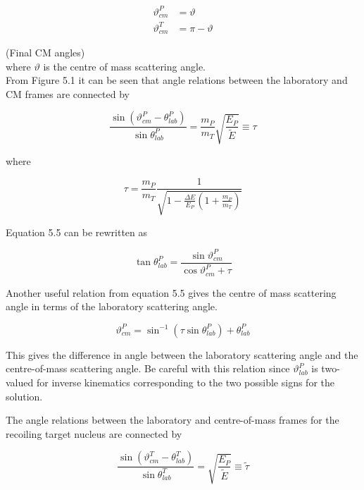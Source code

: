 \documentclass[10pt]{article}
\begin{document}
$$
\begin{aligned}
\vartheta_{c m}^{P} & =\vartheta \\
\vartheta_{c m}^{T} & =\pi-\vartheta
\end{aligned}
$$

(Final CM angles)\\
where $\vartheta$ is the centre of mass scattering angle.\\
From Figure 5.1 it can be seen that angle relations between the laboratory and CM frames are connected by


\begin{equation*}
\frac{\sin \left(\vartheta_{c m}^{P}-\theta_{l a b}^{P}\right)}{\sin \theta_{l a b}^{P}}=\frac{m_{P}}{m_{T}} \sqrt{\frac{E_{P}}{\tilde{E}}} \equiv \tau \tag{5.5}
\end{equation*}


where


\begin{equation*}
\tau=\frac{m_{P}}{m_{T}} \frac{1}{\sqrt{1-\frac{\Delta E}{E_{P}}\left(1+\frac{m_{P}}{m_{T}}\right)}} \tag{5.6}
\end{equation*}


Equation 5.5 can be rewritten as


\begin{equation*}
\tan \theta_{l a b}^{P}=\frac{\sin \vartheta_{c m}^{P}}{\cos \vartheta_{c m}^{P}+\tau} \tag{5.7}
\end{equation*}


Another useful relation from equation 5.5 gives the centre of mass scattering angle in terms of the laboratory scattering angle.


\begin{equation*}
\vartheta_{c m}^{P}=\sin ^{-1}\left(\tau \sin \theta_{l a b}^{P}\right)+\theta_{l a b}^{P} \tag{5.8}
\end{equation*}


This gives the difference in angle between the laboratory scattering angle and the centre-of-mass scattering angle. Be careful with this relation since $\vartheta_{l a b}^{P}$ is two-valued for inverse kinematics corresponding to the two possible signs for the solution.

The angle relations between the laboratory and centre-of-mass frames for the recoiling target nucleus are connected by


\begin{equation*}
\frac{\sin \left(\vartheta_{c m}^{T}-\theta_{l a b}^{T}\right)}{\sin \theta_{l a b}^{T}}=\sqrt{\frac{E_{P}}{\tilde{E}}} \equiv \tilde{\tau} \tag{5.9}
\end{equation*}
\end{document}
